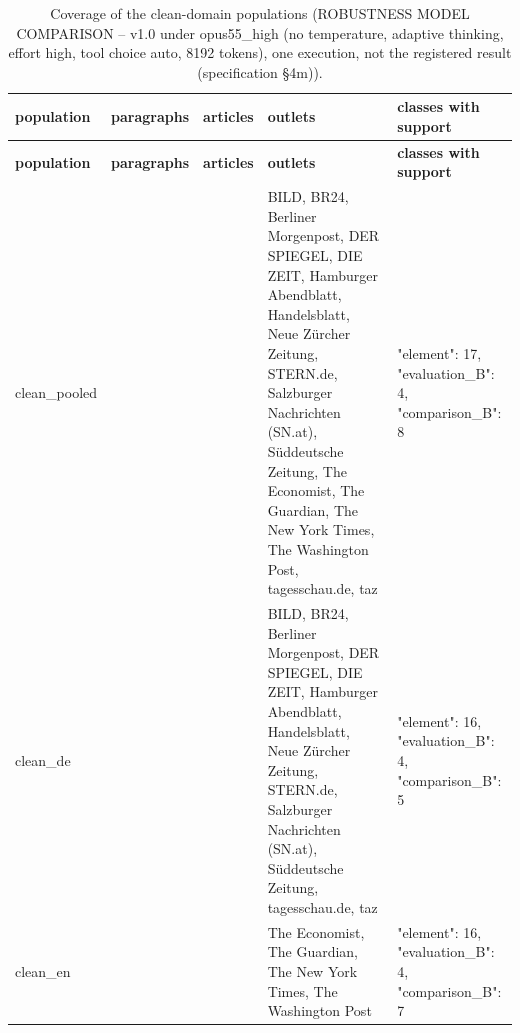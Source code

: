 \begingroup\footnotesize
\begin{longtable}{>{\raggedright\arraybackslash}p{66.8pt}>{\raggedright\arraybackslash}p{65.6pt}>{\raggedright\arraybackslash}p{52.9pt}>{\raggedright\arraybackslash}p{120.6pt}>{\raggedright\arraybackslash}p{89.2pt}}
\caption{Coverage of the clean-domain populations (ROBUSTNESS MODEL COMPARISON -- v1.0 under opus55\_\allowbreak{}high (no temperature, adaptive thinking, effort high, tool choice auto, 8192 tokens), one execution, not the registered result (specification §4m)).} \\
\toprule
\textbf{population} & \textbf{paragraphs} & \textbf{articles} & \textbf{outlets} & \textbf{classes with support} \\
\midrule
\endfirsthead
\toprule
\textbf{population} & \textbf{paragraphs} & \textbf{articles} & \textbf{outlets} & \textbf{classes with support} \\
\midrule
\endhead
\bottomrule
\endfoot
clean\_\allowbreak{}pooled & 105 & 50 & BILD, BR24, Berliner Morgenpost, DER SPIEGEL, DIE ZEIT, Hamburger Abendblatt, Handelsblatt, Neue Zürcher Zeitung, STERN.de, Salzburger Nachrichten (SN.at), Süddeutsche Zeitung, The Economist, The Guardian, The New York Times, The Washington Post, tagesschau.de, taz & {"element":\allowbreak{} 17, "evaluation\_\allowbreak{}B":\allowbreak{} 4, "comparison\_\allowbreak{}B":\allowbreak{} 8} \\
clean\_\allowbreak{}de & 49 & 24 & BILD, BR24, Berliner Morgenpost, DER SPIEGEL, DIE ZEIT, Hamburger Abendblatt, Handelsblatt, Neue Zürcher Zeitung, STERN.de, Salzburger Nachrichten (SN.at), Süddeutsche Zeitung, tagesschau.de, taz & {"element":\allowbreak{} 16, "evaluation\_\allowbreak{}B":\allowbreak{} 4, "comparison\_\allowbreak{}B":\allowbreak{} 5} \\
clean\_\allowbreak{}en & 56 & 26 & The Economist, The Guardian, The New York Times, The Washington Post & {"element":\allowbreak{} 16, "evaluation\_\allowbreak{}B":\allowbreak{} 4, "comparison\_\allowbreak{}B":\allowbreak{} 7} \\
\end{longtable}
\endgroup
